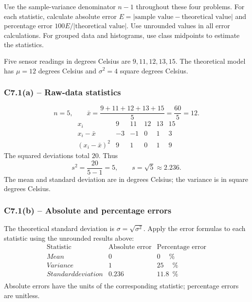 Use the sample-variance denominator $n-1$ throughout these four problems.
For each statistic, calculate absolute error $E=|\text{sample value}-\text{theoretical value}|$
and percentage error $100E/|\text{theoretical value}|$. Use unrounded values in all error calculations.
For grouped data and histograms, use class midpoints to estimate the statistics.

{
Five sensor readings in degrees Celsius are $9,11,12,13,15$.
The theoretical model has $\mu=12$ degrees Celsius and
$\sigma^2=4$ square degrees Celsius.
\label{sol:c7-1a}
\subsubsection*{C7.1(a) -- Raw-data statistics }
\[
 n=5,\qquad\bar{x}=\frac{9+11+12+13+15}{5}=\frac{60}{5}=12.
\]
\[
\begin{array}{c|rrrrr}
x_i&9&11&12&13&15\\\hline
x_i-\bar{x}&-3&-1&0&1&3\\
(x_i-\bar{x})^2&9&1&0&1&9
\end{array}
\]
The squared deviations total $20$. Thus
\[
 s^2=\frac{20}{5-1}=5,\qquad s=\sqrt{5}\approx2.236.
\]
The mean and standard deviation are in degrees Celsius; the variance is
in square degrees Celsius.
\label{sol:c7-1b}
\subsubsection*{C7.1(b) -- Absolute and percentage errors }
The theoretical standard deviation is $\sigma=\sqrt{\sigma^2}$.
Apply the error formulas to each statistic using the unrounded results above:
\[
\begin{array}{l|rr}
\text{Statistic}&\text{Absolute error}&\text{Percentage error}\\\hline
Mean&0\phantom{.000}&0\phantom{.00}\%\\
Variance&1\phantom{.000}&25\phantom{.00}\%\\
Standard deviation&0.236&11.8\phantom{0}\%\\
\end{array}
\]
Absolute errors have the units of the corresponding statistic; percentage errors are unitless.
\secInicio[sec:c7-1]

}
